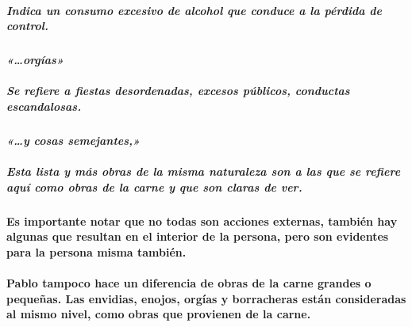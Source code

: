 \documentclass[11a pt,twoside]{article}
\newcommand{\scripture}[1]{%
  {\fontsize{12pt}{16pt}\selectfont\ScriptureFont\itshape #1}%
}
\def\textbf#1{#1}%
\let\oldparagraph\paragraph
\renewcommand{\paragraph}{\needspace{3\baselineskip}\oldparagraph}
\let\oldsubparagraph\subparagraph
\renewcommand{\subparagraph}{\needspace{2\baselineskip}\oldsubparagraph}
\begin{document}
\subparagraph{Indica un consumo excesivo de alcohol que conduce a la
pérdida de
control.}\label{indica-un-consumo-excesivo-de-alcohol-que-conduce-a-la-puxe9rdida-de-control.}

\paragraph{\texorpdfstring{\scripture{«…orgías»}}{}}\label{orguxedas}

\subparagraph{Se refiere a fiestas desordenadas, excesos públicos,
conductas
escandalosas.}\label{se-refiere-a-fiestas-desordenadas-excesos-puxfablicos-conductas-escandalosas.}

\paragraph{\texorpdfstring{\scripture{«…y cosas semejantes,»}}{}}\label{y-cosas-semejantes}

\subparagraph{\texorpdfstring{Esta lista y \textbf{más obras} de la
misma naturaleza son a las que se refiere aquí como obras de la carne y
que son claras de
ver.}{Esta lista y más obras de la misma naturaleza son a las que se refiere aquí como obras de la carne y que son claras de ver.}}\label{esta-lista-y-muxe1s-obras-de-la-misma-naturaleza-son-a-las-que-se-refiere-aquuxed-como-obras-de-la-carne-y-que-son-claras-de-ver.}

\paragraph{Es importante notar que no todas son acciones externas,
también hay algunas que resultan en el interior de la persona, pero son
evidentes para la persona misma
también.}\label{es-importante-notar-que-no-todas-son-acciones-externas-tambiuxe9n-hay-algunas-que-resultan-en-el-interior-de-la-persona-pero-son-evidentes-para-la-persona-misma-tambiuxe9n.}

\paragraph{Pablo tampoco hace un diferencia de obras de la carne grandes
o pequeñas. Las envidias, enojos, orgías y borracheras están
consideradas al mismo nivel, como obras que provienen de la
carne.}\label{pablo-tampoco-hace-un-diferencia-de-obras-de-la-carne-grandes-o-pequeuxf1as.-las-envidias-enojos-orguxedas-y-borracheras-estuxe1n-consideradas-al-mismo-nivel-como-obras-que-provienen-de-la-carne.}
\end{document}
